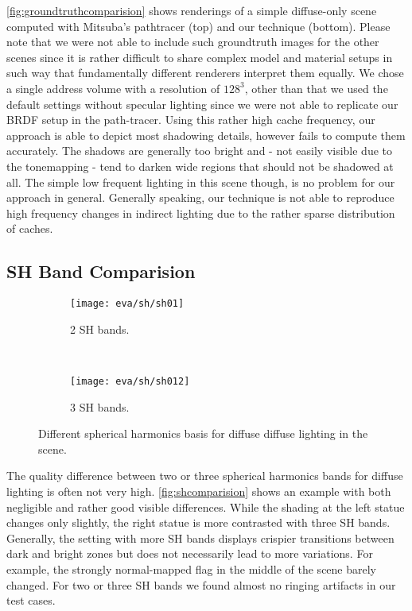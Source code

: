 \documentclass[thesis.tex]{subfiles}
\begin{document}
\autoref{fig:groundtruthcomparision} shows renderings of a simple diffuse-only scene computed with Mitsuba's pathtracer \cite{bib:mitsuba} (top) and our technique (bottom).
Please note that we were not able to include such groundtruth images for the other scenes since it is rather difficult to share complex model and material setups in such way that fundamentally different renderers interpret them equally.
We chose a single address volume with a resolution of $128^3$, other than that we used the default settings without specular lighting since we were not able to replicate our BRDF setup in the path-tracer.
Using this rather high cache frequency, our approach is able to depict most shadowing details, however fails to compute them accurately.
The shadows are generally too bright and - not easily visible due to the tonemapping - tend to darken wide regions that should not be shadowed at all.
The simple low frequent lighting in this scene though, is no problem for our approach in general.
Generally speaking, our technique is not able to reproduce high frequency changes in indirect lighting due to the rather sparse distribution of caches.

\subsection{SH Band Comparision} \label{sec:eva:shquality}
\begin{figure}[h]
\centering
\begin{subfigure}[b]{0.9\textwidth}
\texttt{[image: eva/sh/sh01]}
\caption{2 SH bands.}
\end{subfigure}
\\
\begin{subfigure}[b]{0.9\textwidth}
\texttt{[image: eva/sh/sh012]}
\caption{3 SH bands.}
\end{subfigure}
\caption{Different spherical harmonics basis for diffuse diffuse lighting in the  scene.}
\label{fig:shcomparision}
\end{figure}
The quality difference between two or three spherical harmonics bands for diffuse lighting is often not very high.
\autoref{fig:shcomparision} shows an example with both negligible and rather good visible differences.
While the shading at the left statue changes only slightly, the right statue is more contrasted with three SH bands.
Generally, the setting with more SH bands displays crispier transitions between dark and bright zones but does not necessarily lead to more variations.
For example, the strongly normal-mapped flag in the middle of the scene barely changed.
For two or three SH bands we found almost no ringing artifacts in our test cases.
\end{document}
